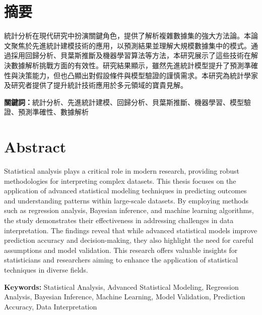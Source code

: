 \chapter*{\hfill 摘要\hfill}
統計分析在現代研究中扮演關鍵角色，提供了解析複雜數據集的強大方法論。本論文聚焦於先進統計建模技術的應用，以預測結果並理解大規模數據集中的模式。通過採用回歸分析、貝葉斯推斷及機器學習算法等方法，本研究展示了這些技術在解決數據解析挑戰方面的有效性。研究結果顯示，雖然先進統計模型提升了預測準確性與決策能力，但也凸顯出對假設條件與模型驗證的謹慎需求。本研究為統計學家及研究者提供了提升統計技術應用於多元領域的寶貴見解。

\vspace*{12pt}

\noindent\textbf{關鍵詞：}統計分析、先進統計建模、回歸分析、貝葉斯推斷、機器學習、模型驗證、預測準確性、數據解析
\clearpage

\chapter*{\hfill Abstract\hfill}
Statistical analysis plays a critical role in modern research, providing robust methodologies for interpreting complex datasets. This thesis focuses on the application of advanced statistical modeling techniques in predicting outcomes and understanding patterns within large-scale datasets. By employing methods such as regression analysis, Bayesian inference, and machine learning algorithms, the study demonstrates their effectiveness in addressing challenges in data interpretation. The findings reveal that while advanced statistical models improve prediction accuracy and decision-making, they also highlight the need for careful assumptions and model validation. This research offers valuable insights for statisticians and researchers aiming to enhance the application of statistical techniques in diverse fields.

\vspace*{12pt}

\noindent\textbf{Keywords: }Statistical Analysis, Advanced Statistical Modeling, Regression Analysis, Bayesian Inference, Machine Learning, Model Validation, Prediction Accuracy, Data Interpretation
\clearpage
